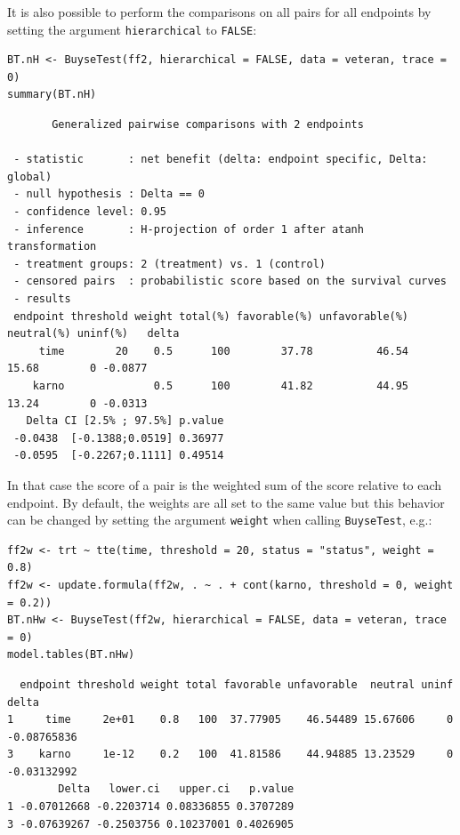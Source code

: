 \documentclass[12pt]{article}
\begin{document}
\bigskip

It is also possible to perform the comparisons on all pairs for all
endpoints by setting the argument \texttt{hierarchical} to \texttt{FALSE}:
\lstset{language=r,label= ,caption= ,captionpos=b,numbers=none}
\begin{lstlisting}
BT.nH <- BuyseTest(ff2, hierarchical = FALSE, data = veteran, trace = 0)
summary(BT.nH)
\end{lstlisting}

\begin{verbatim}
       Generalized pairwise comparisons with 2 endpoints

 - statistic       : net benefit (delta: endpoint specific, Delta: global) 
 - null hypothesis : Delta == 0 
 - confidence level: 0.95 
 - inference       : H-projection of order 1 after atanh transformation 
 - treatment groups: 2 (treatment) vs. 1 (control) 
 - censored pairs  : probabilistic score based on the survival curves
 - results
 endpoint threshold weight total(%) favorable(%) unfavorable(%) neutral(%) uninf(%)   delta
     time        20    0.5      100        37.78          46.54      15.68        0 -0.0877
    karno              0.5      100        41.82          44.95      13.24        0 -0.0313
   Delta CI [2.5% ; 97.5%] p.value 
 -0.0438  [-0.1388;0.0519] 0.36977 
 -0.0595  [-0.2267;0.1111] 0.49514
\end{verbatim}

In that case the score of a pair is the weighted sum of the score
relative to each endpoint. By default, the weights are all set to the
same value but this behavior can be changed by setting the argument
\texttt{weight} when calling \texttt{BuyseTest}, e.g.:
\lstset{language=r,label= ,caption= ,captionpos=b,numbers=none}
\begin{lstlisting}
ff2w <- trt ~ tte(time, threshold = 20, status = "status", weight = 0.8)
ff2w <- update.formula(ff2w, . ~ . + cont(karno, threshold = 0, weight = 0.2))
BT.nHw <- BuyseTest(ff2w, hierarchical = FALSE, data = veteran, trace = 0)
model.tables(BT.nHw)
\end{lstlisting}

\begin{verbatim}
  endpoint threshold weight total favorable unfavorable  neutral uninf       delta
1     time     2e+01    0.8   100  37.77905    46.54489 15.67606     0 -0.08765836
3    karno     1e-12    0.2   100  41.81586    44.94885 13.23529     0 -0.03132992
        Delta   lower.ci   upper.ci   p.value
1 -0.07012668 -0.2203714 0.08336855 0.3707289
3 -0.07639267 -0.2503756 0.10237001 0.4026905
\end{verbatim}
\end{document}
